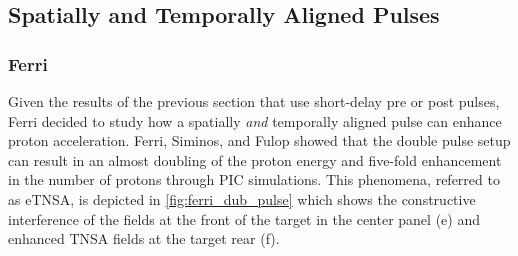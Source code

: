 

\subsection{Spatially and Temporally Aligned Pulses}

\subsubsection{Ferri}
Given the results of the previous section\cite{Markey_2010_PRL,Scott_2012_APL,Ferri_2018_PoP} that use short-delay pre or post pulses, Ferri decided to study how a spatially \emph{and} temporally aligned pulse can enhance proton acceleration. Ferri, Siminos, and Fulop showed that the double pulse setup can result in an almost doubling of the proton energy and five-fold enhancement in the number of protons\cite{Ferri_2019_Nat_Comm} through PIC simulations. This phenomena, referred to as eTNSA, is depicted in \cref{fig:ferri_dub_pulse} which shows the constructive interference of the fields at the front of the target in the center panel (e) and enhanced TNSA fields at the target rear (f).

